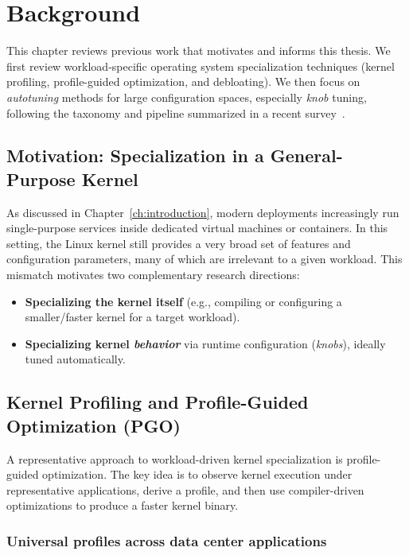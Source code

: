 \chapter{Background}\label{ch:background}

This chapter reviews previous work that motivates and informs this thesis.
We first review workload-specific operating system specialization techniques (kernel profiling, profile-guided optimization, and debloating).
We then focus on \emph{autotuning} methods for large configuration spaces, especially \textit{knob} tuning, following the taxonomy and pipeline summarized in a recent survey~\cite{autotune_survey}.

\section{Motivation: Specialization in a General-Purpose Kernel}\label{sec:bg-motivation}

As discussed in Chapter~\ref{ch:introduction}, modern deployments increasingly run single-purpose services inside dedicated virtual machines or containers.
In this setting, the Linux kernel still provides a very broad set of features and configuration parameters, many of which are irrelevant to a given workload. This mismatch motivates two complementary research directions:
\begin{itemize}
    \item \textbf{Specializing the kernel itself} (e.g., compiling or configuring a smaller/faster kernel for a target workload).
    \item \textbf{Specializing kernel \emph{behavior}} via runtime configuration (\textit{knobs}), ideally tuned automatically.
\end{itemize}

\section{Kernel Profiling and Profile-Guided Optimization (PGO)}\label{sec:bg-pgo}

A representative approach to workload-driven kernel specialization is profile-guided optimization.
The key idea is to observe kernel execution under representative applications, derive a profile, and then use compiler-driven optimizations to produce a faster kernel binary.

\subsection{Universal profiles across data center applications}\label{sec:bg-one-profile}

